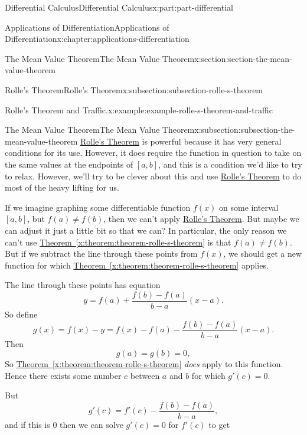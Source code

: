 \documentclass[twoside,10pt,]{tufte-book}
\newcommand{\xreffont}{\relax}
\numberwithin{equation}{part}
\begin{document}
\begin{partptx}{Differential Calculus}{}{Differential Calculus}{}{}{x:part:part-differential}
\begin{chapterptx}{Applications of Differentiation}{}{Applications of Differentiation}{}{}{x:chapter:applications-differentiation}
\begin{sectionptx}{The Mean Value Theorem}{}{The Mean Value Theorem}{}{}{x:section:section-the-mean-value-theorem}
\begin{subsectionptx}{Rolle's Theorem}{}{Rolle's Theorem}{}{}{x:subsection:subsection-rolle-s-theorem}
\begin{example}{Rolle's Theorem and Traffic.}{x:example:example-rolle-s-theorem-and-traffic}
\end{example}
\end{subsectionptx}
%
%
\typeout{************************************************}
\typeout{************************************************}
%
\begin{subsectionptx}{The Mean Value Theorem}{}{The Mean Value Theorem}{}{}{x:subsection:subsection-the-mean-value-theorem}
\hyperref[x:theorem:theorem-rolle-s-theorem]{Rolle's Theorem} is powerful because it has very general conditions for its use. However, it does require the function in question to take on the same values at the endpoints of \([a,b]\), and this is a condition we'd like to try to relax. However, we'll try to be clever about this and use \hyperref[x:theorem:theorem-rolle-s-theorem]{Rolle's Theorem} to do most of the heavy lifting for us.%
\par
If we imagine graphing some differentiable function \(f(x)\) on some interval \([a,b]\), but \(f(a)\neq f(b)\), then we can't apply \hyperref[x:theorem:theorem-rolle-s-theorem]{Rolle's Theorem}. But maybe we can adjust it just a little bit so that we can? In particular, the only reason we can't use \hyperref[x:theorem:theorem-rolle-s-theorem]{Theorem~{\xreffont\ref{x:theorem:theorem-rolle-s-theorem}}} is that \(f(a)\neq f(b)\). But if we subtract the line through these points from \(f(x)\), we should get a new function for which \hyperref[x:theorem:theorem-rolle-s-theorem]{Theorem~{\xreffont\ref{x:theorem:theorem-rolle-s-theorem}}} applies.%
\par
The line through these points has equation%
\begin{equation*}
y = f(a) + \frac{f(b) - f(a)}{b-a}(x-a).
\end{equation*}
So define%
\begin{equation*}
g(x) = f(x) - y = f(x) - f(a) - \frac{f(b) - f(a)}{b-a}(x-a).
\end{equation*}
Then%
\begin{equation*}
g(a) = g(b) = 0,
\end{equation*}
So \hyperref[x:theorem:theorem-rolle-s-theorem]{Theorem~{\xreffont\ref{x:theorem:theorem-rolle-s-theorem}}} \emph{does} apply to this function. Hence there exists some number \(c\) between \(a\) and \(b\) for which \(g'(c) = 0\).%
\par
But%
\begin{equation*}
g'(c) = f'(c) - \frac{f(b) - f(a)}{b-a},
\end{equation*}
and if this is \(0\) then we can solve \(g'(c) = 0\) for \(f'(c)\) to get%

\end{subsectionptx}
\end{sectionptx}
\end{chapterptx}
\end{partptx}
\end{document}
